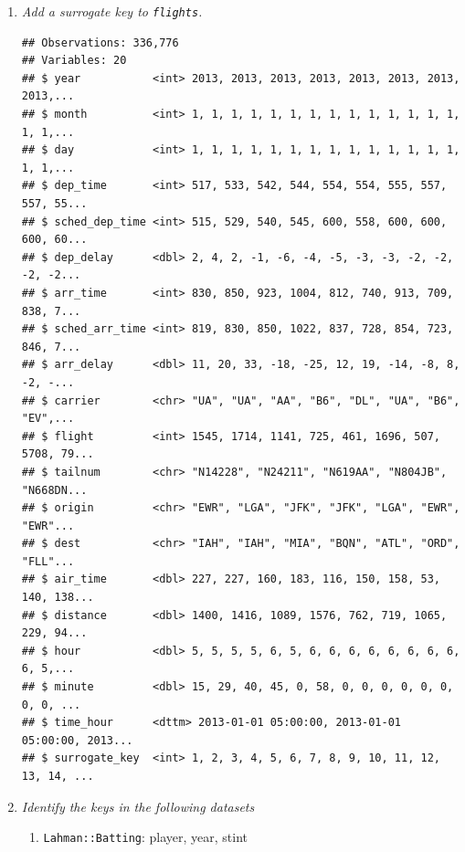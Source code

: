 \documentclass[]{book}
\newenvironment{Shaded}{\begin{snugshade}}{\end{snugshade}}
\newcommand{\DataTypeTok}[1]{\textcolor[rgb]{0.13,0.29,0.53}{#1}}
\newcommand{\KeywordTok}[1]{\textcolor[rgb]{0.13,0.29,0.53}{\textbf{#1}}}
\newcommand{\NormalTok}[1]{#1}
\newcommand{\OperatorTok}[1]{\textcolor[rgb]{0.81,0.36,0.00}{\textbf{#1}}}
\newcommand{\StringTok}[1]{\textcolor[rgb]{0.31,0.60,0.02}{#1}}
\providecommand{\tightlist}{%
  \setlength{\itemsep}{0pt}\setlength{\parskip}{0pt}}
\theoremstyle{definition}
\theoremstyle{definition}
\theoremstyle{definition}
\theoremstyle{remark}
\begin{document}
\begin{enumerate}
\def\labelenumi{\arabic{enumi}.}
\item
  \emph{Add a surrogate key to \texttt{flights}.}

\begin{Shaded}
\end{Shaded}

\begin{verbatim}
## Observations: 336,776
## Variables: 20
## $ year           <int> 2013, 2013, 2013, 2013, 2013, 2013, 2013, 2013,...
## $ month          <int> 1, 1, 1, 1, 1, 1, 1, 1, 1, 1, 1, 1, 1, 1, 1, 1,...
## $ day            <int> 1, 1, 1, 1, 1, 1, 1, 1, 1, 1, 1, 1, 1, 1, 1, 1,...
## $ dep_time       <int> 517, 533, 542, 544, 554, 554, 555, 557, 557, 55...
## $ sched_dep_time <int> 515, 529, 540, 545, 600, 558, 600, 600, 600, 60...
## $ dep_delay      <dbl> 2, 4, 2, -1, -6, -4, -5, -3, -3, -2, -2, -2, -2...
## $ arr_time       <int> 830, 850, 923, 1004, 812, 740, 913, 709, 838, 7...
## $ sched_arr_time <int> 819, 830, 850, 1022, 837, 728, 854, 723, 846, 7...
## $ arr_delay      <dbl> 11, 20, 33, -18, -25, 12, 19, -14, -8, 8, -2, -...
## $ carrier        <chr> "UA", "UA", "AA", "B6", "DL", "UA", "B6", "EV",...
## $ flight         <int> 1545, 1714, 1141, 725, 461, 1696, 507, 5708, 79...
## $ tailnum        <chr> "N14228", "N24211", "N619AA", "N804JB", "N668DN...
## $ origin         <chr> "EWR", "LGA", "JFK", "JFK", "LGA", "EWR", "EWR"...
## $ dest           <chr> "IAH", "IAH", "MIA", "BQN", "ATL", "ORD", "FLL"...
## $ air_time       <dbl> 227, 227, 160, 183, 116, 150, 158, 53, 140, 138...
## $ distance       <dbl> 1400, 1416, 1089, 1576, 762, 719, 1065, 229, 94...
## $ hour           <dbl> 5, 5, 5, 5, 6, 5, 6, 6, 6, 6, 6, 6, 6, 6, 6, 5,...
## $ minute         <dbl> 15, 29, 40, 45, 0, 58, 0, 0, 0, 0, 0, 0, 0, 0, ...
## $ time_hour      <dttm> 2013-01-01 05:00:00, 2013-01-01 05:00:00, 2013...
## $ surrogate_key  <int> 1, 2, 3, 4, 5, 6, 7, 8, 9, 10, 11, 12, 13, 14, ...
\end{verbatim}
\item
  \emph{Identify the keys in the following datasets}

  \begin{enumerate}
  \def\labelenumii{\arabic{enumii}.}
  \tightlist
  \item
    \texttt{Lahman::Batting}: player, year, stint
  \end{enumerate}


\end{enumerate}
\end{document}
